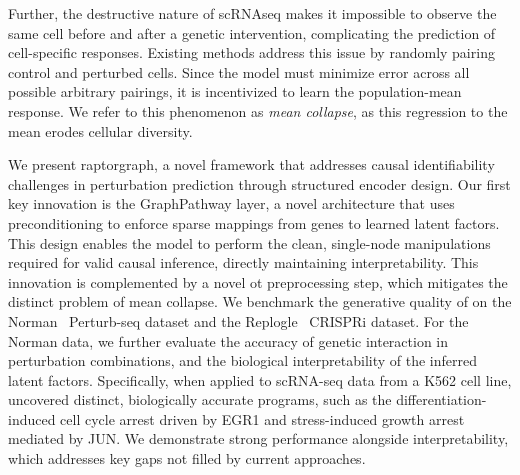Further, the destructive nature of \gls{scRNAseq} makes it impossible to observe the same cell before and after a genetic intervention, complicating the prediction of cell-specific responses.
Existing methods address this issue by randomly pairing control and perturbed cells.
Since the model must minimize error across all possible arbitrary pairings, it is incentivized to learn the population-mean response.
We refer to this phenomenon as \emph{mean collapse}, as this regression to the mean erodes cellular diversity.

We present \gls{raptorgraph}, a novel framework that addresses causal identifiability challenges in perturbation prediction through structured encoder design.
Our first key innovation is the GraphPathway layer, a novel architecture that uses preconditioning to enforce sparse mappings from genes to learned latent factors.
This design enables the model to perform the clean, single-node manipulations required for valid causal inference, directly maintaining interpretability.
This innovation is complemented by a novel \gls{ot} preprocessing step, which mitigates the distinct problem of mean collapse.
We benchmark the generative quality of  on the Norman~\cite{norman2019exploring} Perturb-seq dataset and the Replogle~\cite{replogle_combinatorial_2020} CRISPRi dataset.
For the Norman data, we further evaluate the accuracy of genetic interaction in perturbation combinations, and the biological interpretability of the inferred latent factors.
Specifically, when applied to scRNA-seq data from a K562 cell line,  uncovered distinct, biologically accurate programs, such as the differentiation-induced cell cycle arrest driven by EGR1 and stress-induced growth arrest mediated by JUN.
We demonstrate strong performance alongside interpretability, which addresses key gaps not filled by current approaches.

